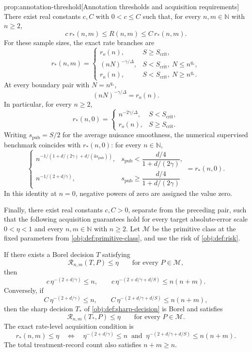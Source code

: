 \begin{propositionv}{prop:annotation-threshold}[Annotation thresholds and acquisition requirements]
There exist real constants \(c,C\) with \(0<c\le C\) such that, for every \(n,m\in\mathbb N\) with \(n\ge2\),
\[
c\,r_*(n,m)\le R(n,m)\le C\,r_*(n,m).
\]
For these sample sizes, the exact rate branches are
\[
r_*(n,m)=
\begin{cases}
r_o(n),&S\ge S_{\mathrm{crit}},\\
(nN)^{-\gamma/\Delta},
&S<S_{\mathrm{crit}},\ N\le n^{q_*},\\
r_o(n),
&S<S_{\mathrm{crit}},\ N\ge n^{q_*}.
\end{cases}
\]
At every boundary pair with \(N=n^{q_*}\),
\[
(nN)^{-\gamma/\Delta}=r_o(n).
\]
In particular, for every \(n\ge2\),
\[
r_*(n,0)=
\begin{cases}
n^{-2\gamma/\Delta},&S<S_{\mathrm{crit}},\\
r_o(n),&S\ge S_{\mathrm{crit}}.
\end{cases}
\]
Writing \(s_{\mathrm{pub}}=S/2\) for the average nuisance smoothness, the numerical supervised benchmark coincides with \(r_*(n,0)\): for every \(n\in\mathbb N\),
\[
\begin{cases}
n^{-1/(1+d/(2\gamma)+d/(4s_{\mathrm{pub}}))},
&s_{\mathrm{pub}}<\dfrac{d/4}{1+d/(2\gamma)},\\
n^{-1/(2+d/\gamma)},
&s_{\mathrm{pub}}\ge\dfrac{d/4}{1+d/(2\gamma)}
\end{cases}
=r_*(n,0).
\]
In this identity at \(n=0\), negative powers of zero are assigned the value zero.

Finally, there exist real constants \(c,C>0\), separate from the preceding pair, such that the following acquisition guarantees hold for every target absolute-error scale \(0<\eta<1\) and every \(n,m\in\mathbb N\) with \(n\ge2\). Let \(\mathcal M\) be the primitive class at the fixed parameters from \cref{obj:def:primitive-class}, and use the risk of \cref{obj:def:risk}.

If there exists a Borel decision \(T\) satisfying
\[
\mathcal R_{n,m}(T,P)\le\eta
\qquad\text{for every }P\in\mathcal M,
\]
then
\[
c\,\eta^{-(2+d/\gamma)}\le n,
\qquad
c\,\eta^{-(2+d/\gamma+d/S)}\le n(n+m).
\]
Conversely, if
\[
C\,\eta^{-(2+d/\gamma)}\le n,
\qquad
C\,\eta^{-(2+d/\gamma+d/S)}\le n(n+m),
\]
then the sharp decision \(T_*\) of \cref{obj:def:sharp-decision} is Borel and satisfies
\[
\mathcal R_{n,m}(T_*,P)\le\eta
\qquad\text{for every }P\in\mathcal M.
\]
The exact rate-level acquisition condition is
\[
r_*(n,m)\le\eta
\quad\Longleftrightarrow\quad
\eta^{-(2+d/\gamma)}\le n
\ \text{ and }\
\eta^{-(2+d/\gamma+d/S)}\le n(n+m).
\]
The total treatment-record count also satisfies \(n+m\ge n\).
\end{propositionv}

